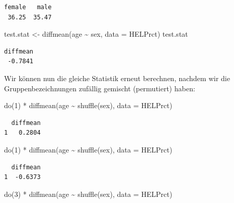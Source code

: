 \documentclass[
  ngerman,
]{scrbook}
\newenvironment{Shaded}{\begin{snugshade}}{\end{snugshade}}
\newcommand{\AttributeTok}[1]{\textcolor[rgb]{0.77,0.63,0.00}{#1}}
\newcommand{\DecValTok}[1]{\textcolor[rgb]{0.00,0.00,0.81}{#1}}
\newcommand{\FunctionTok}[1]{\textcolor[rgb]{0.00,0.00,0.00}{#1}}
\newcommand{\NormalTok}[1]{#1}
\newcommand{\OtherTok}[1]{\textcolor[rgb]{0.56,0.35,0.01}{#1}}
\newcommand{\SpecialCharTok}[1]{\textcolor[rgb]{0.00,0.00,0.00}{#1}}
\begin{document}
\begin{verbatim}
female   male 
 36.25  35.47 
\end{verbatim}

\begin{Shaded}
\begin{Highlighting}[]
\NormalTok{test.stat }\OtherTok{\textless{}{-}} \FunctionTok{diffmean}\NormalTok{(age }\SpecialCharTok{\textasciitilde{}}\NormalTok{ sex, }\AttributeTok{data =}\NormalTok{ HELPrct)}
\NormalTok{test.stat}
\end{Highlighting}
\end{Shaded}

\begin{verbatim}
diffmean 
 -0.7841 
\end{verbatim}

Wir können nun die gleiche Statistik erneut berechnen, nachdem wir die Gruppenbezeichnungen zufällig gemischt (permutiert) haben:

\begin{Shaded}
\begin{Highlighting}[]
\FunctionTok{do}\NormalTok{(}\DecValTok{1}\NormalTok{) }\SpecialCharTok{*} \FunctionTok{diffmean}\NormalTok{(age }\SpecialCharTok{\textasciitilde{}} \FunctionTok{shuffle}\NormalTok{(sex), }\AttributeTok{data =}\NormalTok{ HELPrct)}
\end{Highlighting}
\end{Shaded}

\begin{verbatim}
  diffmean
1   0.2804
\end{verbatim}

\begin{Shaded}
\begin{Highlighting}[]
\FunctionTok{do}\NormalTok{(}\DecValTok{1}\NormalTok{) }\SpecialCharTok{*} \FunctionTok{diffmean}\NormalTok{(age }\SpecialCharTok{\textasciitilde{}} \FunctionTok{shuffle}\NormalTok{(sex), }\AttributeTok{data =}\NormalTok{ HELPrct)}
\end{Highlighting}
\end{Shaded}

\begin{verbatim}
  diffmean
1  -0.6373
\end{verbatim}

\begin{Shaded}
\begin{Highlighting}[]
\FunctionTok{do}\NormalTok{(}\DecValTok{3}\NormalTok{) }\SpecialCharTok{*} \FunctionTok{diffmean}\NormalTok{(age }\SpecialCharTok{\textasciitilde{}} \FunctionTok{shuffle}\NormalTok{(sex), }\AttributeTok{data =}\NormalTok{ HELPrct)}
\end{Highlighting}
\end{Shaded}
\end{document}
